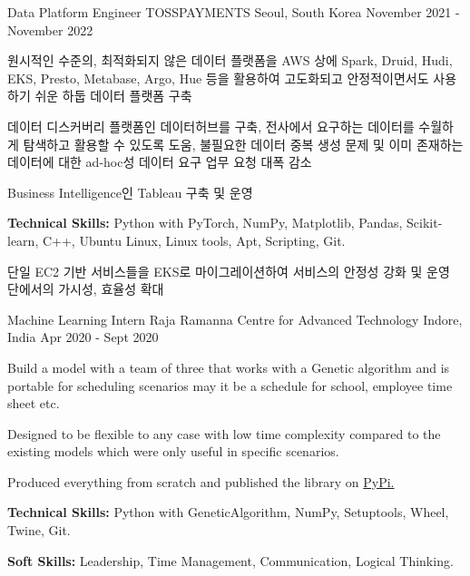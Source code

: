 

\begin{cventries}

  \cventry
    {Data Platform Engineer} %
    {TOSSPAYMENTS} %
    {Seoul, South Korea} %
    {November 2021 - November 2022} %
    {
      \begin{cvitems} %
        \item {원시적인 수준의, 최적화되지 않은 데이터 플랫폼을 AWS 상에 Spark, Druid, Hudi, EKS, Presto, Metabase, Argo, Hue 등을 활용하여 고도화되고 안정적이면서도 사용하기 쉬운 하둡 데이터 플랫폼 구축}
        \item {데이터 디스커버리 플랫폼인 데이터허브를 구축, 전사에서 요구하는 데이터를 수월하게 탐색하고 활용할 수 있도록 도움, 불필요한 데이터 중복 생성 문제 및 이미 존재하는 데이터에 대한 ad-hoc성 데이터 요구 업무 요청 대폭 감소}
        \item {Business Intelligence인 Tableau 구축 및 운영}
        \item {\textbf{Technical Skills:} Python with PyTorch, NumPy, Matplotlib, Pandas, Scikit-learn, C++, Ubuntu Linux, Linux tools, Apt, Scripting, Git.}
        \item {단일 EC2 기반 서비스들을 EKS로 마이그레이션하여 서비스의 안정성 강화 및 운영 단에서의 가시성, 효율성 확대}
      \end{cvitems}
    }

  \cventry
    {Machine Learning Intern} %
    {Raja Ramanna Centre for Advanced Technology} %
    {Indore, India} %
    {Apr 2020 - Sept 2020} %
    {
      \begin{cvitems} %
        \item {Build a model with a team of three that works with a Genetic algorithm and is portable for scheduling scenarios may it be a schedule for school, employee time sheet etc.}
        \item {Designed to be flexible to any case with low time complexity compared to the existing models which were only useful in specific scenarios.}
        \item {Produced everything from scratch and published the library on \href{https://pypi.org/project/genetictabler/}{PyPi.}}
        \item {\textbf{Technical Skills:} Python with GeneticAlgorithm, NumPy, Setuptools, Wheel, Twine, Git.}
        \item {\textbf{Soft Skills:} Leadership, Time Management, Communication, Logical Thinking.}
      \end{cvitems}
    }

\end{cventries}
